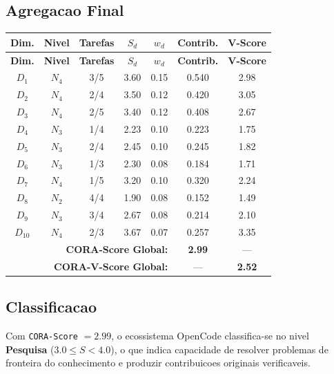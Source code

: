 \subsection{Agregacao Final}

\begin{longtable}{|c|c|c|c|c|c|c|}
\hline
\textbf{Dim.} & \textbf{Nivel} & \textbf{Tarefas} & \textbf{$S_{d}$} & \textbf{$w_{d}$} & \textbf{Contrib.} & \textbf{V-Score} \\
\hline
\endfirsthead
\hline
\textbf{Dim.} & \textbf{Nivel} & \textbf{Tarefas} & \textbf{$S_{d}$} & \textbf{$w_{d}$} & \textbf{Contrib.} & \textbf{V-Score} \\
\hline
\endhead
\hline
\endfoot
$D_1$ & $N_4$ & 3/5 & 3.60 & 0.15 & 0.540 & 2.98 \\
\hline
$D_2$ & $N_4$ & 2/4 & 3.50 & 0.12 & 0.420 & 3.05 \\
\hline
$D_3$ & $N_4$ & 2/5 & 3.40 & 0.12 & 0.408 & 2.67 \\
\hline
$D_4$ & $N_3$ & 1/4 & 2.23 & 0.10 & 0.223 & 1.75 \\
\hline
$D_5$ & $N_3$ & 2/4 & 2.45 & 0.10 & 0.245 & 1.82 \\
\hline
$D_6$ & $N_3$ & 1/3 & 2.30 & 0.08 & 0.184 & 1.71 \\
\hline
$D_7$ & $N_4$ & 1/5 & 3.20 & 0.10 & 0.320 & 2.24 \\
\hline
$D_8$ & $N_2$ & 4/4 & 1.90 & 0.08 & 0.152 & 1.49 \\
\hline
$D_9$ & $N_3$ & 3/4 & 2.67 & 0.08 & 0.214 & 2.10 \\
\hline
$D_{10}$ & $N_4$ & 2/3 & 3.67 & 0.07 & 0.257 & 3.35 \\
\hline
\multicolumn{5}{|r|}{\textbf{CORA-Score Global:}} & \textbf{2.99} & --- \\
\hline
\multicolumn{5}{|r|}{\textbf{CORA-V-Score Global:}} & --- & \textbf{2.52} \\
\hline
\end{longtable}

\subsection{Classificacao}

Com \texttt{CORA-Score} $=2.99$, o ecossistema OpenCode classifica-se no nivel \textbf{Pesquisa} ($3.0 \leq S < 4.0$), o que indica capacidade de resolver problemas de fronteira do conhecimento e produzir contribuicoes originais verificaveis.

\newpage

